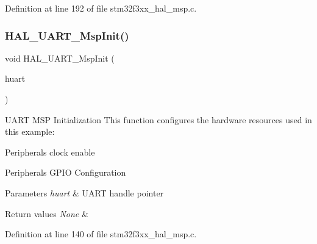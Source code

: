 Definition at line 192 of file stm32f3xx\+\_\+hal\+\_\+msp.\+c.

\mbox{\label{group___h_a_l___m_s_p___private___functions_ga0e553b32211877322f949b14801bbfa7}} 
\subsubsection{H\+A\+L\+\_\+\+U\+A\+R\+T\+\_\+\+Msp\+Init()}
{\footnotesize\ttfamily void H\+A\+L\+\_\+\+U\+A\+R\+T\+\_\+\+Msp\+Init (\begin{DoxyParamCaption}\item[{U\+A\+R\+T\+\_\+\+Handle\+Type\+Def $\ast$}]{huart }\end{DoxyParamCaption})}



U\+A\+RT M\+SP Initialization This function configures the hardware resources used in this example\+: 


\begin{DoxyItemize}
\item Peripheral\textquotesingle{}s clock enable
\item Peripheral\textquotesingle{}s G\+P\+IO Configuration 
\begin{DoxyParams}{Parameters}
{\em huart} & U\+A\+RT handle pointer \\
\hline
\end{DoxyParams}

\begin{DoxyRetVals}{Return values}
{\em None} & \\
\hline
\end{DoxyRetVals}

\end{DoxyItemize}

Definition at line 140 of file stm32f3xx\+\_\+hal\+\_\+msp.\+c.

\mbox{\label{group___h_a_l___m_s_p___private___functions_ga44d09cdf66fec468d956c64a23f61856}} 
